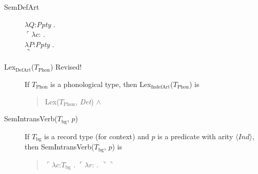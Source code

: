 \begin{description}
        \item[\textnormal{SemDefArt}] \mbox{}


                    $\lambda Q$:\textit{Ppty} . \\
                    \hspace*{1em}$\ulcorner\lambda c$: . \\
  \hspace*{2em}$\lambda P$:\textit{Ppty} . \\
  \hspace*{3em}$\urcorner$


        
      \item[\textnormal{Lex$_{\mathrm{DefArt}}$($T_{\mathrm{Phon}}$)} Revised!]
        \mbox{}

        If $T_{\mathrm{Phon}}$ is a phonological type, then
        Lex$_{\mathrm{IndefArt}}$($T_{\mathrm{Phon}}$) is
        \begin{quote}
          Lex($T_{\mathrm{Phon}}$, \textit{Det}) \d{$\wedge$}
        \end{quote}

      \item[\textnormal{SemIntransVerb($T_{\mathrm{bg}}$, $p$)}]
        \mbox{}

        If $T_{\text{bg}}$ is a record type (for context) and $p$ is a
        predicate with arity $\langle\textit{Ind}\rangle$, then SemIntransVerb($T_{\mathrm{bg}}$, $p$) is
        \begin{quote}
          $\ulcorner\lambda c$:$T_{\mathrm{bg}}$ . $\ulcorner\lambda
          r$:
          . $\urcorner\urcorner$
        \end{quote}


\end{description}
